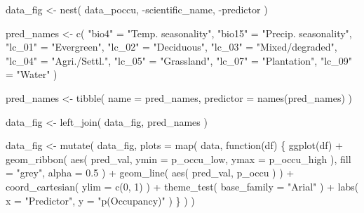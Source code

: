 \documentclass[
]{article}
\newenvironment{Shaded}{}{}
\newcommand{\ControlFlowTok}[1]{\textcolor[rgb]{0.00,0.00,1.00}{#1}}
\newcommand{\DataTypeTok}[1]{#1}
\newcommand{\DecValTok}[1]{#1}
\newcommand{\FloatTok}[1]{#1}
\newcommand{\KeywordTok}[1]{\textcolor[rgb]{0.00,0.00,1.00}{#1}}
\newcommand{\NormalTok}[1]{#1}
\newcommand{\OperatorTok}[1]{#1}
\newcommand{\StringTok}[1]{\textcolor[rgb]{0.00,0.50,0.50}{#1}}
\begin{document}
\begin{Shaded}
\begin{Highlighting}[]
\NormalTok{data_fig <-}\StringTok{ }\KeywordTok{nest}\NormalTok{(}
\NormalTok{  data_poccu,}
  \OperatorTok{-}\NormalTok{scientific_name, }\OperatorTok{-}\NormalTok{predictor}
\NormalTok{)}

\NormalTok{pred_names <-}\StringTok{ }\KeywordTok{c}\NormalTok{(}
  \StringTok{"bio4"}\NormalTok{ =}\StringTok{ "Temp. seasonality"}\NormalTok{,}
  \StringTok{"bio15"}\NormalTok{ =}\StringTok{ "Precip. seasonality"}\NormalTok{,}
  \StringTok{"lc_01"}\NormalTok{ =}\StringTok{ "Evergreen"}\NormalTok{,}
  \StringTok{"lc_02"}\NormalTok{ =}\StringTok{ "Deciduous"}\NormalTok{,}
  \StringTok{"lc_03"}\NormalTok{ =}\StringTok{ "Mixed/degraded"}\NormalTok{,}
  \StringTok{"lc_04"}\NormalTok{ =}\StringTok{ "Agri./Settl."}\NormalTok{,}
  \StringTok{"lc_05"}\NormalTok{ =}\StringTok{ "Grassland"}\NormalTok{,}
  \StringTok{"lc_07"}\NormalTok{ =}\StringTok{ "Plantation"}\NormalTok{,}
  \StringTok{"lc_09"}\NormalTok{ =}\StringTok{ "Water"}
\NormalTok{)}

\NormalTok{pred_names <-}\StringTok{ }\KeywordTok{tibble}\NormalTok{(}
  \DataTypeTok{name =}\NormalTok{ pred_names,}
  \DataTypeTok{predictor =} \KeywordTok{names}\NormalTok{(pred_names)}
\NormalTok{)}

\NormalTok{data_fig <-}\StringTok{ }\KeywordTok{left_join}\NormalTok{(}
\NormalTok{  data_fig,}
\NormalTok{  pred_names}
\NormalTok{)}

\NormalTok{data_fig <-}\StringTok{ }\KeywordTok{mutate}\NormalTok{(}
\NormalTok{  data_fig,}
  \DataTypeTok{plots =} \KeywordTok{map}\NormalTok{(}
\NormalTok{    data, }\ControlFlowTok{function}\NormalTok{(df) \{}
      \KeywordTok{ggplot}\NormalTok{(df) }\OperatorTok{+}
\StringTok{        }\KeywordTok{geom_ribbon}\NormalTok{(}
          \KeywordTok{aes}\NormalTok{(}
\NormalTok{            pred_val,}
            \DataTypeTok{ymin =}\NormalTok{ p_occu_low,}
            \DataTypeTok{ymax =}\NormalTok{ p_occu_high}
\NormalTok{          ),}
          \DataTypeTok{fill =} \StringTok{"grey"}\NormalTok{,}
          \DataTypeTok{alpha =} \FloatTok{0.5}
\NormalTok{        ) }\OperatorTok{+}
\StringTok{        }\KeywordTok{geom_line}\NormalTok{(}
          \KeywordTok{aes}\NormalTok{(}
\NormalTok{            pred_val, p_occu}
\NormalTok{          )}
\NormalTok{        ) }\OperatorTok{+}
\StringTok{        }\KeywordTok{coord_cartesian}\NormalTok{(}
          \DataTypeTok{ylim =} \KeywordTok{c}\NormalTok{(}\DecValTok{0}\NormalTok{, }\DecValTok{1}\NormalTok{)}
\NormalTok{        ) }\OperatorTok{+}
\StringTok{        }\KeywordTok{theme_test}\NormalTok{(}
          \DataTypeTok{base_family =} \StringTok{"Arial"}
\NormalTok{        ) }\OperatorTok{+}
\StringTok{        }\KeywordTok{labs}\NormalTok{(}
          \DataTypeTok{x =} \StringTok{"Predictor"}\NormalTok{,}
          \DataTypeTok{y =} \StringTok{"p(Occupancy)"}
\NormalTok{        )}
\NormalTok{    \}}
\NormalTok{  )}
\NormalTok{)}


\end{Highlighting}
\end{Shaded}
\end{document}

